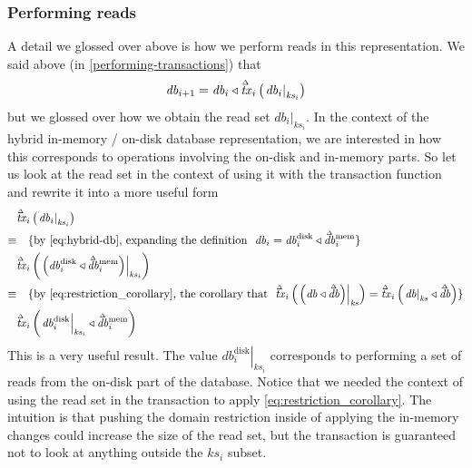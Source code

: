 \documentclass[11pt,a4paper]{article}
\newcommand\restrict[2]{\left.#1\right|_{#2}}
\newcommand\deltavar[1]{\accentset{\Delta}{#1}}
\begin{document}
\subsubsection{Performing reads}

A detail we glossed over above is how we perform reads in this
representation. We said above (in \cref{performing-transactions}) that
\[
\mathit{db}_{i+1} = \mathit{db}_i \triangleleft \deltavar{\mathit{tx}}_i\left(\restrict{\mathit{db}_i}{\mathit{ks}_i}\right)
\]
but we glossed over how we obtain the read set
$\restrict{\mathit{db}_i}{\mathit{ks}_i}$. In the context of the hybrid
in-memory / on-disk database representation, we are interested in how this
corresponds to operations involving the on-disk and in-memory parts. So let us
look at the read set in the context of using it with the transaction function
and rewrite it into a more useful form
\begin{align*}
       & \deltavar{\mathit{tx}}_i\left(\restrict{\mathit{db}_i}{\mathit{ks}_i}\right)
\\
\equiv & \quad \text{\{by \cref{eq:hybrid-db}, expanding the definition ~$\mathit{db}_i = \mathit{db}^{\mathrm{disk}}_i \triangleleft \deltavar{\mathit{db}}^{\mathrm{mem}}_i$\}}
\\
       & \deltavar{\mathit{tx}}_i\left(\restrict{\left(\mathit{db}^{\mathrm{disk}}_i \triangleleft \deltavar{\mathit{db}}^{\mathrm{mem}}_i\right)}{\mathit{ks}_i}\right)
\\
\equiv & \quad \text{\{by \cref{eq:restriction_corollary}, the corollary that ~$\deltavar{\mathit{tx}}_i\left(\restrict{\left(\mathit{db} \triangleleft \deltavar{\mathit{db}}\right)}{\mathit{ks}}\right)
=
  \deltavar{\mathit{tx}}_i\left(\restrict{\mathit{db}}{\mathit{ks}} \triangleleft \deltavar{\mathit{db}}\right)$\}}
\\
       & \deltavar{\mathit{tx}}_i\left(\restrict{\mathit{db}^{\mathrm{disk}}_i}{\mathit{ks}_i} \triangleleft \deltavar{\mathit{db}}^{\mathrm{mem}}_i\right)
\end{align*}
This is a very useful result. The value $\restrict{\mathit{db}^{\mathrm{disk}}_i}{\mathit{ks}_i}$
corresponds to performing a set of reads from the on-disk part of the database.
Notice that we needed the context of using the read set in the transaction to
apply \cref{eq:restriction_corollary}. The intuition is that pushing the
domain restriction inside of applying the in-memory changes could increase the
size of the read set, but the transaction is guaranteed not to look at anything
outside the $\mathit{ks}_i$ subset.
\end{document}
